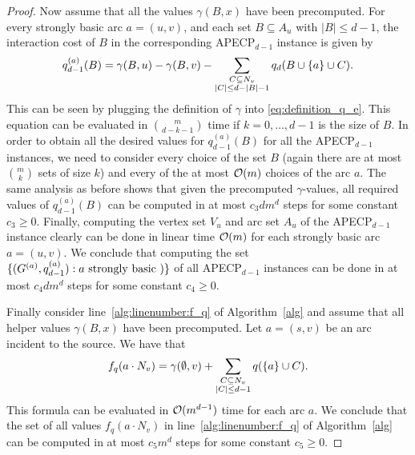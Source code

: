 \begin{proof}
    Now assume that all the values $\gamma(B, x)$ have been precomputed. For every strongly basic arc $a = (u, v)$, and each set $B \subseteq A_u$ with $|B| \leq d-1$, the interaction cost of $B$ in the corresponding APECP$_{d-1}$ instance is given by
    \begin{align*}
        q_{d-1}^{(a)}(B) = \gamma(B,u) - \gamma(B, v) - \sum_{\substack{C \subseteq N_v\\ |C| \leq d - |B| - 1}}q_d(B \cup \{ a \} \cup C).
    \end{align*}
    This can be seen by plugging the definition of $\gamma$ into \cref{eq:definition_q_e}. This equation can be evaluated in $\binom{m}{d - k -1}$ time if $k=0,\dots,d-1$ is the size of $B$. In order to obtain all the desired values for $q^{(a)}_{d-1}(B)$ for all the APECP$_{d-1}$ instances, we need to consider every choice of the set $B$ (again there are at most $\binom{m}{k}$ sets of size $k$) and every of the at most $\mathcal{O}(m)$ choices of the arc $a$. 
    The same analysis as before shows that given the precomputed $\gamma$-values, all required values of $q^{(a)}_{d-1}(B)$ can be computed in at most $c_3dm^d$ steps for some constant $c_3 \geq 0$. Finally, computing the vertex set $V_u$ and arc set $A_u$ of the APECP$_{d-1}$ instance clearly can be done in linear time $\mathcal{O}(m)$ for each strongly basic arc $a = (u,v)$. We conclude that computing the set $\{ (G^{(a)}, q^{(a)}_{d-1}) : a \text{ strongly basic }) \}$ of all APECP$_{d-1}$ instances can be done in at most $c_4dm^d$ steps for some constant $c_4 \geq 0$.

    
    Finally consider line~\ref{alg:linenumber:f_q} of Algorithm~\ref{alg} and assume that all helper values $\gamma(B,x)$ have been precomputed. Let $a = (s,v)$ be an arc incident to the source. We have that
    \begin{align*}
        f_q(a \cdot N_v) = \gamma(\emptyset, v) + \sum_{\substack{C \subseteq N_v\\ |C| \leq d - 1}}q(\{ a \} \cup C).
    \end{align*}
    This formula can be evaluated in $\mathcal{O}(m^{d-1})$ time for each arc $a$. We conclude that the set of all values $f_q(a \cdot N_v)$ in line~\ref{alg:linenumber:f_q} of Algorithm~\ref{alg} can be computed in at most $c_5m^d$ steps for some constant $c_5 \geq 0$. 
\end{proof}

